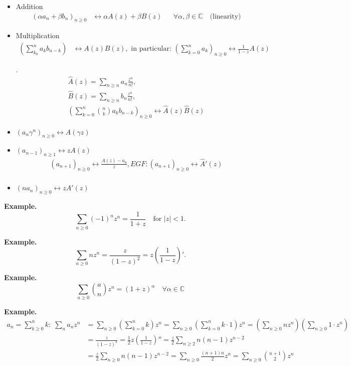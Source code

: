 \begin{itemize}
\item Addition
\begin{align*}
    (\alpha a_n + \beta b_n)_{n≥0}
        &\leftrightarrow \alpha A(z) + \beta B(z)
        &&\forall \alpha, \beta \in \mathbb{C}
        \quad\text{(linearity)} 
\end{align*}
\item Multiplication
\begin{align*}
    \left(\sum_{k_0}^{n} a_k b_{n-k} \right)
        &\leftrightarrow A(z) B(z),
        \text{ in particular: }
        \left(\sum_{k=0}^n a_k\right)_{n≥0} \leftrightarrow \frac{1}{1-z} A(z)
\end{align*}

\Remark.
\begin{align*}
    \hat{A}(z) = \sum_{n \geq n} a_n \frac{z^n}{n!}, \\
    \hat{B}(z) = \sum_{n \geq n} b_n \frac{z^n}{n!}, \\
    \left(\sum_{k=0}^n \binom{n}{ k} a_k b_{n-k}\right)_{n \geq 0}
        \leftrightarrow \hat A(z)\hat B(z)
\end{align*}

\item $
    (a_n \gamma^n)_{n≥0} 
        ↔ A(\gamma z) $
\item $ (a_{n-1})_{n≥1}↔ z A(z)$
\begin{align*}
        (a_{n+1})_{n≥0} ↔ \frac{A(z)-a_0}z,
        EGF: (a_{n+1})_{n≥0} ↔ \hat A'(z) \\
\end{align*}
\item $(n a_n)_{n≥0}↔ z A'(z)$

\end{itemize}

\textbf{Example.}
\[
    \sum_{n≥0} (-1)^n z^n
    = \frac{1}{1+z} \quad\text{for $|z| < 1$}.
\]

\textbf{Example.}
\[
    \sum_{n≥0} n z^n
    = \frac{z}{(1-z)^2}
    = z \left(\frac1{1-z}\right)'.
\]

\textbf{Example.}
\[
    \sum_{n≥0} \binom{a}{n} z^n
    = (1+z)^\alpha
    \quad\forall\alpha\in\mathbb{C}
\]

\textbf{Example.}
\begin{align*}
    a_n = \sum_{k≥0}^n k:\;
    \sum_n a_n z^n
    &= \sum_{n≥0}
        \left(\sum_{k=0}^n k\right) z^n
    = \sum_{n≥0} \left(\sum_{k=0}^n  k\cdot 1\right) z^n
        = \left( \sum_{n≥0} n z^n \right) \left( \sum_{n≥0} 1 \cdot z^n \right)\\
    &= \frac{z}{(1-z)^3}
    = \frac12 z \left(\frac{1}{1-z}\right)''
    = \frac z2 \sum_{n≥2} n(n-1) z^{n-2}\\
    &= \frac z2 \sum_{n≥0} n(n-1) z^{n-2}
    = \sum_{n≥0} \frac{(n+1)n}{2} z^n
    = \sum_{n≥0} {\binom{n+1}{2}} z^n
\end{align*}

